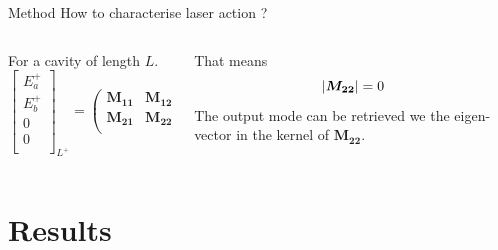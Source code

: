 \documentclass[aspectratio=169]{beamer}
\begin{document}
\begin{frame}{Method}
	\alert{How to characterise laser action ?}
	\begin{columns}
		\begin{column}{0.5\textwidth}
			For a cavity of length $L$.
		\begin{equation*}
		\begin{bmatrix}
		E_a^+ \\
		E_b^+ \\
		0 \\
		0 \\
		\end{bmatrix}_{L^+} = \begin{pmatrix}
		\bm{M_{11}} & \bm{M_{12}}\\
		\bm{M_{21}} & \bm{M_{22}}\\
		\end{pmatrix}\begin{bmatrix}
		0 \\
		0 \\
		E_a^- \\
		E_b^- \\
		\end{bmatrix}_{0^-}
		\end{equation*}
		\end{column}
		\begin{column}{0.5\textwidth}
			That means
			\begin{equation*}
				\abs{\bm{M_{22}}} = 0
			\end{equation*}
			The output mode can be retrieved we the eigen-vector in the kernel of $\bm{M_{22}}$.
		\end{column}
	\end{columns}
\end{frame}
\section{Results}
\end{document}
